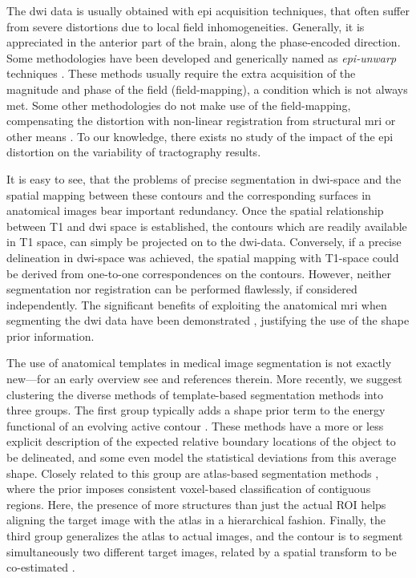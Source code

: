The \ac{dwi} data is usually obtained with \ac{epi}
acquisition techniques, that often suffer from severe distortions due to 
local field inhomogeneities. Generally, it is appreciated in the anterior
part of the brain, along the phase-encoded direction. Some methodologies have
been developed and generically named as \emph{\ac{epi}-unwarp} techniques
\cite{holland_efficient_2010,hsu_correction_2009,jezzard_characterization_2005,
reber_correction_2005}. These methods usually 
require the extra acquisition of the magnitude and phase of
the field (field-mapping), a condition which is not always met. Some other 
methodologies do not make use of the field-mapping, compensating the distortion
with non-linear registration from structural \ac{mri} or other means
\citep{andersson_modeling_2001}. To our knowledge, there exists no study
of the impact of the \ac{epi} distortion on the variability of tractography
results. 

It is easy to see, that the problems of precise segmentation in \ac{dwi}-space and the spatial mapping between these contours and the corresponding surfaces in anatomical images bear important redundancy. Once the spatial relationship between T1 and \ac{dwi} space is established, the contours which are readily available in T1 space, can simply be projected on to the \ac{dwi}-data. Conversely, if a precise delineation in \ac{dwi}-space was achieved, the spatial mapping with T1-space could be derived from one-to-one correspondences on the contours. However, neither segmentation nor registration can be performed flawlessly, if considered independently. The significant benefits of exploiting the anatomical \ac{mri} when segmenting the \ac{dwi} data have been demonstrated \cite{zollei_improved_2010}, justifying the use
of the shape prior information. 

The use of anatomical templates in medical image segmentation is not exactly new---for an early overview see \citep{McInerney1996} and references therein. More recently, we suggest clustering the diverse methods of template-based segmentation methods into three groups. The first group typically adds a shape prior term to the energy functional of an evolving active contour \citep{Rousson2002,Chen2002,Paragios2003,Vemuri2003a,Yezzi2003a,Gastaud2004,Chan2005,Cremers2006,Bresson2006a,Ayvaci2007,Schmid2008}.
These methods have a more or less explicit description of the expected relative boundary locations of the object to be delineated, and some even model the statistical deviations from this average shape. Closely related to this group are atlas-based segmentation methods \citep{Pohl2005,Pohl2006,Wang2006,Gorthi2009,Gorthi2011}, where the prior imposes consistent voxel-based classification of contiguous regions. Here, the presence of more structures than just the actual ROI helps aligning the target image with the atlas in a hierarchical fashion. Finally, the third group generalizes the atlas to actual images, and the contour is to segment simultaneously two different target images, related by a spatial transform to be co-estimated \citep{Wyatt2003,Yezzi2003}.

